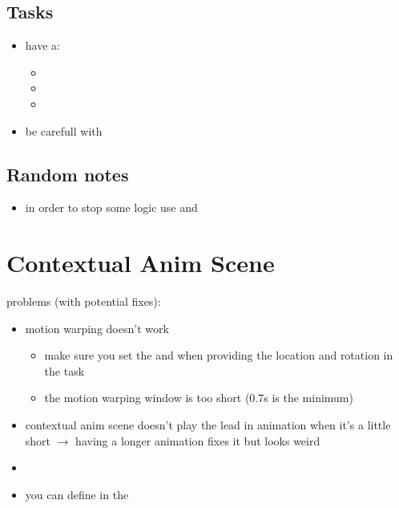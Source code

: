         \subsection{Tasks}
            \begin{itemize}
                \item have a:
                \begin{itemize}
                    \item {}
                    \item {}
                    \item {}
                \end{itemize}
                \item be carefull with 
            \end{itemize}


        \subsection{Random notes}
            \begin{itemize}
                \item in order to stop some logic use  and 
            \end{itemize}

    \section{Contextual Anim Scene}
        problems (with potential fixes):
        \begin{itemize}
            \item motion warping doesn't work 
            \begin{itemize}
                \item make sure you set the  and  when providing the location and rotation in the task
                \item the motion warping window is too short (0.7s is the minimum)
            \end{itemize}
            \item contextual anim scene doesn't play the lead in animation when it's a little short $\rightarrow$ having a longer animation fixes it but looks weird
            \item 
            \item you can define  in the 
        \end{itemize}

